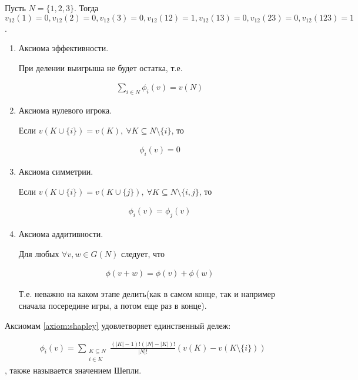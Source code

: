\documentclass[../main.tex]{subfiles}
\begin{document}
\begin{exmpl}
	Пусть $N = \{1, 2, 3\}$. Тогда $v_{12}(1) = 0, v_{12}(2) = 0, v_{12}(3) = 0, v_{12}(12) = 1, v_{12}(13) = 0, v_{12}(23) = 0, v_{12}(123) = 1$.
\end{exmpl}

\begin{df}[Аксиомы] \label{axiom:shapley}
	\begin{enumerate}
		\item Аксиома эффективности.\label{axiom:shapley_efficenty} 

		При делении выигрыша не будет остатка, т.е. 

		\begin{align*}
			\sum_{i \in N} \phi_i(v) = v(N)
		\end{align*}
		\item Аксиома нулевого игрока. \label{axiom:shapley_zero_player}

		Если $v(K \cup \{i\}) = v(K), \  \forall K \subseteq N \setminus \{i\}$, то 

		\begin{align*}
			\phi_i(v) = 0
		\end{align*}

	\item Аксиома симметрии. \label{axiom:shapley_symmetry}

		Если $v(K \cup \{i\}) = v(K \cup \{j\}), \ \forall K \subseteq N \setminus \{i, j\}$, то 

		\begin{align*}
			\phi_i(v) = \phi_j(v)
		\end{align*}

	\item Аксиома аддитивности. \label{axiom:shapley_additivity}

		Для любых $\forall v, w \in G(N)$ следует, что

		\begin{align*}
			\phi(v + w) = \phi(v) + \phi(w)
		\end{align*}

		Т.е. неважно на каком этапе делить(как в самом конце, так и например сначала посередине игры, а потом еще раз в конце).
	\end{enumerate}
\end{df}

\begin{thm} \label{theorem:shepli}
	Аксиомам \ref{axiom:shapley} удовлетворяет единственный дележ:

	\begin{align*}
		\phi_i(v) = \sum_{\substack{K \subseteq N \\ i \in K}} \frac{(|K| - 1)! (|N| - |K|)!}{|N|!} (v(K) - v(K \setminus \{i\}))
	\end{align*}, также называется значением Шепли.

\end{thm}
\end{document}
